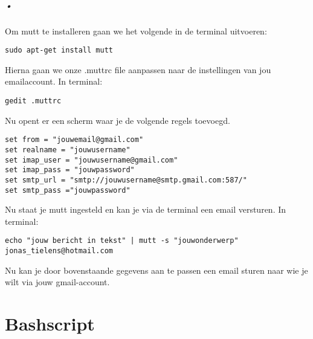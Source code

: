 \documentclass[11pt]{report}
\begin{document}
\paragraph{•}
Om mutt te installeren gaan we het volgende in de terminal uitvoeren:
\begin{lstlisting}
sudo apt-get install mutt
\end{lstlisting}
Hierna gaan we onze .muttrc file aanpassen naar de instellingen van jou emailaccount.
In terminal:
\begin{lstlisting}
gedit .muttrc
\end{lstlisting}
Nu opent er een scherm waar je de volgende regels toevoegd.
\begin{lstlisting}
set from = "jouwemail@gmail.com"
set realname = "jouwusername"
set imap_user = "jouwusername@gmail.com"
set imap_pass = "jouwpassword"
set smtp_url = "smtp://jouwusername@smtp.gmail.com:587/"
set smtp_pass ="jouwpassword"
\end{lstlisting}
Nu staat je mutt ingesteld en kan je via de terminal een email versturen.
In terminal:
\begin{lstlisting}
echo "jouw bericht in tekst" | mutt -s "jouwonderwerp" jonas_tielens@hotmail.com
\end{lstlisting}
Nu kan je door bovenstaande gegevens aan te passen een email sturen naar wie je wilt via jouw gmail-account.
\newpage
\renewcommand{\appendixname}{Bijlage}
\chapter{Bashscript}
\begin{lstlisting}
\end{lstlisting}
\newpage
\listoffigures
\listoftables
\printindex
 

\nocite{SiteGit,SiteMutt,SiteMutt2,SiteGit,SiteVoorNadelen,SiteVergelijking,SiteWat,SiteInstall}
\end{document}

